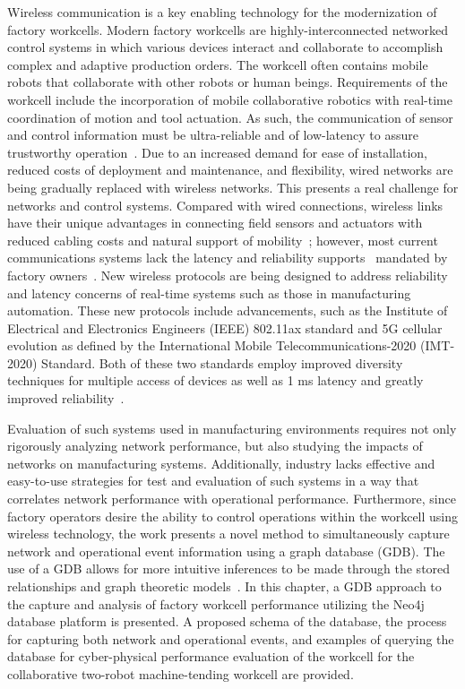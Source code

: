 Wireless communication is a key enabling technology for the modernization of factory workcells. Modern factory workcells are highly-interconnected networked control systems in which various devices interact and collaborate to accomplish complex and adaptive production orders. The workcell often contains mobile robots that collaborate with other robots or human beings. Requirements of the workcell include the incorporation of mobile collaborative robotics with real-time coordination of motion and tool actuation.  As such, the communication of sensor and control information must be ultra-reliable and of low-latency to assure trustworthy operation~\cite{wirelessAutomation2017}. Due to an increased demand for ease of installation, reduced costs of deployment and maintenance, and flexibility, wired networks are being gradually replaced with wireless networks. This presents a real challenge for networks and control systems. Compared with wired connections, wireless links have their unique advantages in connecting field sensors and actuators with reduced cabling costs and natural support of mobility~\cite{ieMag2018}; however, most current communications systems lack the latency and reliability supports~\cite{etsi103588} mandated by factory owners~\cite{Industry40, SmartManuf}.  New wireless protocols are being designed to address reliability and latency concerns of real-time systems such as those in manufacturing automation.  These new protocols include advancements, such as the Institute of Electrical and Electronics Engineers (IEEE) 802.11ax standard and 5G cellular evolution as defined by the International Mobile Telecommunications-2020 (IMT-2020) Standard.  Both of these two standards employ improved diversity techniques for multiple access of devices as well as 1 ms latency and greatly improved reliability~\cite{80211ax}. 

Evaluation of such systems used in manufacturing environments requires not only rigorously analyzing  network performance, but also studying the impacts of networks on manufacturing systems. Additionally, industry lacks effective and easy-to-use strategies for test and evaluation of such systems in a way that correlates network performance with operational performance. Furthermore, since factory operators desire the ability to control operations within the workcell using wireless technology, the work presents a novel method to simultaneously capture network and operational event information using a graph database (GDB).  The use of a GDB allows for more intuitive inferences to be made through the stored relationships and graph theoretic models~\cite{Angles:2008:SGD:1322432.1322433}. In this chapter, a GDB approach to the capture and analysis of factory workcell performance utilizing the Neo4j database platform is presented. A proposed schema of the database, the process for capturing both network and operational events, and examples of querying the database for cyber-physical performance evaluation of the workcell for the collaborative two-robot machine-tending workcell\cite{Liu2019vancouver} are provided.


